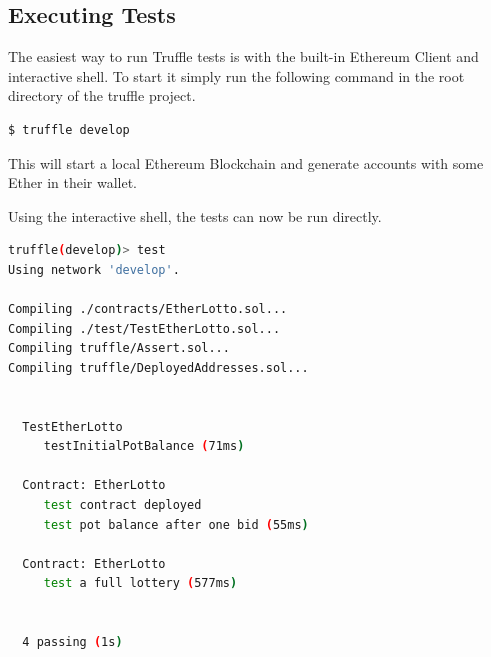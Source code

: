 \subsection{Executing Tests}\label{sec:execTests}

The easiest way to run Truffle tests is with the built-in Ethereum Client and interactive shell. To start it simply run the following command in the root directory of the truffle project.
\begin{lstlisting}[language=bash]
$ truffle develop
\end{lstlisting}
This will start a local Ethereum Blockchain and generate accounts with some Ether in their wallet.

Using the interactive shell, the tests can now be run directly.
\begin{lstlisting}[language=bash]
truffle(develop)> test
Using network 'develop'.

Compiling ./contracts/EtherLotto.sol...
Compiling ./test/TestEtherLotto.sol...
Compiling truffle/Assert.sol...
Compiling truffle/DeployedAddresses.sol...


  TestEtherLotto
     testInitialPotBalance (71ms)

  Contract: EtherLotto
     test contract deployed
     test pot balance after one bid (55ms)

  Contract: EtherLotto
     test a full lottery (577ms)


  4 passing (1s)
\end{lstlisting}




\chapterend


